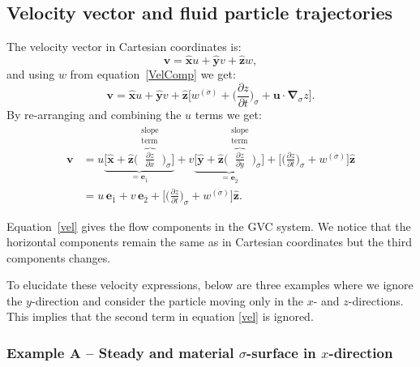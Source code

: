 \subsection{Velocity vector and fluid particle trajectories}

The velocity vector in Cartesian coordinates is:
\begin{equation}
\boldsymbol{v} = \boldsymbol{\hat{x}}u + \boldsymbol{\hat{y}}v + \boldsymbol{\hat{z}}w,
\end{equation}
and using $w$ from equation~\eqref{VelComp} we get:
\begin{equation}
\boldsymbol{v} =  \boldsymbol{\hat{x}}u + \boldsymbol{\hat{y}}v + \boldsymbol{\hat{z}} \bigg [w^{(\dot{\sigma})} + \bigg (\frac{\partial z}{\partial t} \bigg )_\sigma + \boldsymbol{u} \cdot\boldsymbol{\nabla}_\sigma z \bigg].
\end{equation}
By re-arranging and combining the $u$ terms we get:
\begin{align}
\boldsymbol{v} &=  u\underbrace{\bigg [\boldsymbol{\hat{x}} + \boldsymbol{\hat{z}}  \bigg (\!\overbrace{\frac{\partial z}{\partial x}}^{\substack{\text{slope}\\\text{term}}} \! \bigg )_\sigma \bigg]}_{=\boldsymbol{e}_{\bar{1}}} 
+ v  \underbrace{\bigg [\boldsymbol{\hat{y}} + \boldsymbol{\hat{z}}  \bigg (\!\overbrace{\frac{\partial z}{\partial y}}^{\substack{\text{slope}\\\text{term}}} \!\bigg )_\sigma \bigg]}_{=\boldsymbol{e}_{\bar{2}}} 
+ \bigg [ \bigg (\frac{\partial z}{\partial t}\bigg )_\sigma + w^{(\dot{\sigma})} \bigg]\boldsymbol{\hat{z}} \nonumber\\
&=  u\,\boldsymbol{e}_{\bar{1}} + v\,\boldsymbol{e}_{\bar{2}} + \bigg [ \bigg (\frac{\partial z}{\partial t}\bigg )_\sigma + w^{(\dot{\sigma})} \bigg]\boldsymbol{\hat{z}}.
\label{vel}
\end{align} 

Equation~\eqref{vel} gives the flow components in the GVC system. We notice that the horizontal components remain the same as in Cartesian coordinates but the third components changes.

To elucidate these velocity expressions, below are three examples where we ignore the $y$-direction and consider the particle moving only in the $x$- and $z$-directions. This implies that the second term in equation \eqref{vel} is ignored.

\subsubsection*{Example A -- Steady and material $\sigma$-surface in $x$-direction} 

